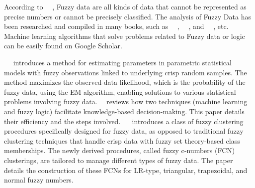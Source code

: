 \documentclass[../ICIT-Paper-2024.tex]{subfiles}
\begin{document}
According to ~\citeauthor{viertl2011statistical}~\cite{viertl2011statistical}, Fuzzy data are all kinds of data that cannot be represented as precise numbers or cannot be precisely classified. The analysis of Fuzzy Data has been researched and compiled in many books, such as ~\citeauthor{bandemer2012fuzzy}~\cite{bandemer2012fuzzy}, ~\citeauthor{viertl2011statistical}~\cite{viertl2011statistical}, and ~\citeauthor{nguyen2006fundamentals}~\cite{nguyen2006fundamentals}, etc. Machine learning algorithms that solve problems related to Fuzzy data or logic can be easily found on Google Scholar.



~\citeauthor{denoeux2011maximum}~\cite{denoeux2011maximum} introduces a method for estimating parameters in parametric statistical models with fuzzy observations linked to underlying crisp random samples. The method maximizes the observed-data likelihood, which is the probability of the fuzzy data, using the EM algorithm, enabling solutions to various statistical problems involving fuzzy data. ~\citeauthor{jane2019review}~\cite{jane2019review}reviews how two techniques (machine learning and fuzzy logic) facilitate knowledge-based decision-making. This paper details their efficiency and the steps involved. ~\citeauthor{yang1996class}~\cite{yang1996class} introduces a class of fuzzy clustering procedures specifically designed for fuzzy data, as opposed to traditional fuzzy clustering techniques that handle crisp data with fuzzy set theory-based class memberships. The newly derived procedures, called fuzzy c-numbers (FCN) clusterings, are tailored to manage different types of fuzzy data. The paper details the construction of these FCNs for LR-type, triangular, trapezoidal, and normal fuzzy numbers.
\end{document}
